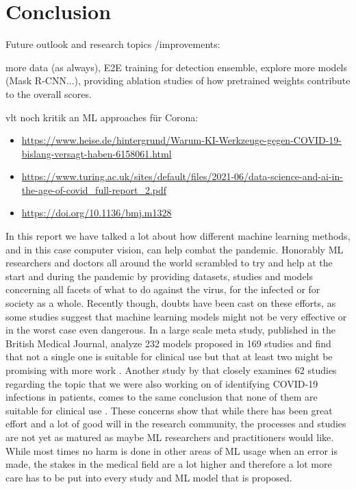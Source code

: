 \chapter{Conclusion}\label{chapter:conclusion}


Future outlook and research topics /improvements:

more data (as always), E2E training for detection ensemble, explore more models (Mask R-CNN...), providing ablation studies of how pretrained weights contribute to the overall scores.

vlt noch kritik an ML approaches für Corona:
 \begin{itemize}
 	\item \url{https://www.heise.de/hintergrund/Warum-KI-Werkzeuge-gegen-COVID-19-bislang-versagt-haben-6158061.html}
 	\item \url{https://www.turing.ac.uk/sites/default/files/2021-06/data-science-and-ai-in-the-age-of-covid_full-report_2.pdf}
 	\item \url{https://doi.org/10.1136/bmj.m1328}
 \end{itemize}

In this report we have talked a lot about how different machine learning methods, and in this case computer vision, can help combat the pandemic. Honorably ML researchers and doctors all around the world scrambled to try and help at the start and during the pandemic by providing datasets, studies and models concerning all facets of what to do against the virus, for the infected or for society as a whole. Recently though, doubts have been cast on these efforts, as some studies suggest that machine learning models might not be very effective or in the worst case even dangerous. In a large scale meta study, published in the British Medical Journal, \citeauthor{wynants_prediction_2020} analyze 232 models proposed in 169 studies and find that not a single one is suitable for clinical use but that at least two might be promising with more work \autocite{wynants_prediction_2020}. Another study by \citeauthor{aix-covnet_common_2021} that closely examines 62 studies regarding the topic that we were also working on of identifying COVID-19 infections in patients, comes to the same conclusion that none of them are suitable for clinical use \autocite{aix-covnet_common_2021}. These concerns show that while there has been great effort and a lot of good will in the research community, the processes and studies are not yet as matured as maybe ML researchers and practitioners would like. While most times no harm is done in other areas of ML usage when an error is made, the stakes in the medical field are a lot higher and therefore a lot more care has to be put into every study and ML model that is proposed. 